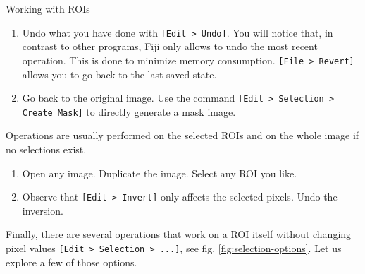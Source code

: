 \begin{taskbox}{Working with ROIs}
\begin{enumerate}
	\item Undo what you have done with \texttt{[Edit > Undo]}. You will notice that, in contrast to other programs, Fiji only allows to undo the most recent operation. This is done to minimize memory consumption. \texttt{[File > Revert]} allows you to go back to the last saved state.
	\item Go back to the original image. Use the command \texttt{[Edit > Selection > Create Mask]} to directly generate a mask image.
\end{enumerate}

Operations are usually performed on the selected ROIs and on the whole image if no selections exist. 
\begin{enumerate}
	\item Open any image. Duplicate the image. Select any ROI you like. 
	\item Observe that \texttt{[Edit > Invert]} only affects the selected pixels. Undo the inversion.
\end{enumerate}

Finally, there are several operations that work on a ROI itself without changing pixel values \texttt{[Edit > Selection > ...]}, see fig. \ref{fig:selection-options}. Let us explore a few of those options.

\begin{minipage}[t]{\linewidth}
		\begin{center}
		\medskip
		\label{fig:selection-options}
		\end{center}
	\end{minipage}



\end{taskbox}
